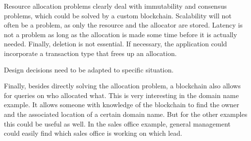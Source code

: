 Resource allocation problems clearly deal with immutability and consensus problems, which could be solved by a custom blockchain. Scalability will not often be a problem, as only the resource and the allocator are stored. Latency is not a problem as long as the allocation is made some time before it is actually needed. Finally, deletion is not essential. If necessary, the application could incorporate a transaction type that frees up an allocation.

Design decisions need to be adapted to specific situation.

Finally, besides directly solving the allocation problem, a blockchain also allows for queries on who allocated what. This is very interesting in the domain name example. It allows someone with knowledge of the blockchain to find the owner and the associated location of a certain domain name. But for the other examples this could be useful as well. In the sales office example, general management could easily find which sales office is working on which lead.